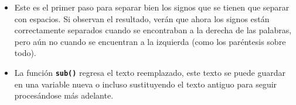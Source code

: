 \documentclass[%
usenames,dvipsnames] {beamer}
\begin{document}
{{\begin{itemize}
	\item Este es el primer paso para separar bien los signos que se tienen que separar con espacios. Si observan el resultado, verán que ahora los signos están correctamente separados cuando se encontraban a la derecha de las palabras, pero aún no cuando se encuentran a la izquierda (como los paréntesis sobre todo).
	\item La función {\tt\textbf{sub()}} regresa el texto reemplazado, este texto se puede guardar en una variable nueva o incluso sustituyendo el texto antiguo para seguir procesándose más adelante.
\end{itemize}
}
}




\end{document}
